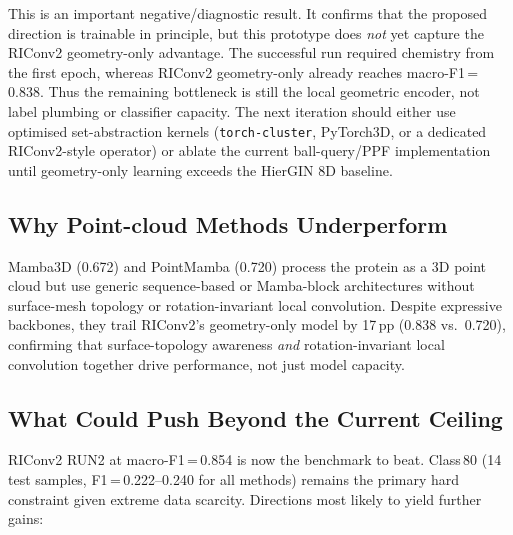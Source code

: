 This is an important negative/diagnostic result.
It confirms that the proposed direction is trainable in principle, but this
prototype does \emph{not} yet capture the RIConv2 geometry-only advantage.
The successful run required chemistry from the first epoch, whereas RIConv2
geometry-only already reaches macro-F1\,=\,0.838.
Thus the remaining bottleneck is still the local geometric encoder, not label
plumbing or classifier capacity.
The next iteration should either use optimised set-abstraction kernels
(\texttt{torch-cluster}, PyTorch3D, or a dedicated RIConv2-style operator) or
ablate the current ball-query/PPF implementation until geometry-only learning
exceeds the HierGIN 8D baseline.

\subsection{Why Point-cloud Methods Underperform}

Mamba3D (0.672) and PointMamba (0.720) process the protein as a 3D point cloud
but use generic sequence-based or Mamba-block architectures without surface-mesh
topology or rotation-invariant local convolution.
Despite expressive backbones, they trail RIConv2's geometry-only model by
17\,pp (0.838 vs.\ 0.720), confirming that surface-topology awareness
\emph{and} rotation-invariant local convolution together drive performance,
not just model capacity.

\subsection{What Could Push Beyond the Current Ceiling}

RIConv2 RUN2 at macro-F1\,=\,0.854 is now the benchmark to beat.
Class\,80 (14 test samples, F1\,=\,0.222--0.240 for all methods) remains the
primary hard constraint given extreme data scarcity.
Directions most likely to yield further gains:

